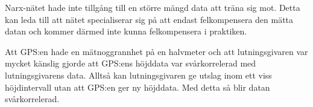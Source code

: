 {Narx-nätet hade inte tillgång till en större mängd data att träna sig mot. Detta kan leda till att nätet specialiserar sig på att endast felkompensera den mätta datan och kommer därmed inte kunna felkompensera i praktiken.

Att GPS:en hade en mätnoggrannhet på en halvmeter och att lutningsgivaren var mycket känslig gjorde att GPS:ens höjddata var svårkorrelerad med lutningsgivarens data. Alltså kan lutningsgivaren ge utslag inom ett viss höjdintervall utan att GPS:en ger ny höjddata. Med detta så blir datan svårkorrelerad.



}
